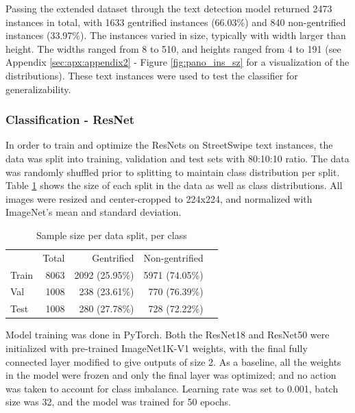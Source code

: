 Passing the extended dataset through the text detection model returned 2473 instances in total, with 1633 gentrified instances (66.03\%) and 840 non-gentrified instances (33.97\%). The instances varied in size, typically with width larger than height. The widths ranged from 8 to 510, and heights ranged from 4 to 191 (see Appendix \ref{sec:apx:appendix2} - Figure \ref{fig:pano_ins_sz} for a visualization of the distributions). These text instances were used to test the classifier for generalizability.


\subsubsection{Classification - ResNet}

In order to train and optimize the ResNets on StreetSwipe text instances, the data was split into training, validation and test sets with 80:10:10 ratio. The data was randomly shuffled prior to splitting to maintain class distribution per split. Table \ref{tab:data_split} shows the size of each split in the data as well as class distributions. All images were resized and center-cropped to 224x224, and normalized with ImageNet's mean and standard deviation.

{
\setlength\intextsep{0pt}
\begin{table}
    \begin{tabular}{lrrrl}
    \toprule
            & \multicolumn{1}{r}{Total} &\multicolumn{1}{r}{Gentrified} & \multicolumn{1}{r}{Non-gentrified} \\ \cline{1-4}
Train       & 8063                      & 2092 (25.95\%)                & 5971 (74.05\%)      \\
Val         & 1008                      & 238 (23.61\%)                 & 770 (76.39\%)       \\
Test        & 1008                      & 280 (27.78\%)                 & 728 (72.22\%)       \\
    \bottomrule
    \end{tabular}
    \caption{Sample size per data split, per class}
    \label{tab:data_split}
\vspace{-10pt}
\end{table}
}

Model training was done in PyTorch. Both the ResNet18 and ResNet50 were initialized with pre-trained ImageNet1K-V1 weights, with the final fully connected layer modified to give outputs of size 2. As a baseline, all the weights in the model were frozen and only the final layer was optimized; and no action was taken to account for class imbalance. Learning rate was set to 0.001, batch size was 32, and the model was trained for 50 epochs.

